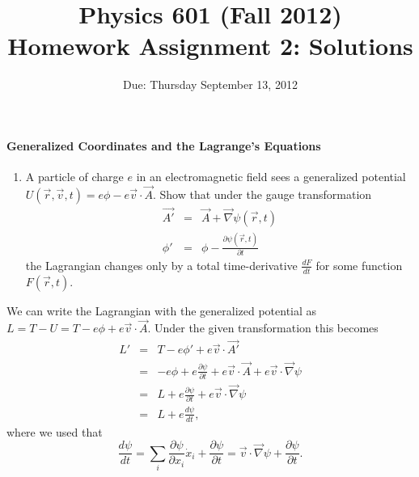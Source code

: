 \documentclass[letterpaper,11pt]{article}
\title{Physics 601 (Fall 2012) \\ Homework Assignment 2: Solutions}
\date{Due: Thursday September 13, 2012}
\begin{document}
\maketitle

\paragraph*{Generalized Coordinates and the Lagrange's Equations}
\begin{enumerate}
 \item A particle of charge $e$ in an electromagnetic field sees a generalized potential $U(\vec{r},\vec{v},t) = e \phi - e \vec{v} \cdot \vec{A}$.  Show that under the gauge transformation
  \begin{eqnarray*}
   \vec{A'} & = & \vec{A} + \vec{\nabla} \psi(\vec{r},t) \\
   \phi'    & = & \phi - \frac{\partial\psi(\vec{r},t)}{\partial t}
  \end{eqnarray*}
 the Lagrangian changes only by a total time-derivative $\frac{dF}{dt}$ for some function $F(\vec{r},t)$.
\end{enumerate}
We can write the Lagrangian with the generalized potential as $L = T - U = T - e \phi + e \vec{v} \cdot \vec{A}$.  Under the given transformation this becomes
\begin{eqnarray*}
 L' & = & T - e \phi' + e \vec{v} \cdot \vec{A'} \\
 & = &  - e \phi + e \frac{\partial\psi}{\partial t} + e \vec{v} \cdot \vec{A} + e \vec{v} \cdot \vec{\nabla} \psi \\
 & = & L + e \frac{\partial\psi}{\partial t} + e \vec{v} \cdot \vec{\nabla} \psi \\
 & = & L + e \frac{d\psi}{dt},
\end{eqnarray*}
where we used that
\begin{equation*}
 \frac{d\psi}{dt} = \sum_i \frac{\partial\psi}{\partial x_i} \dot{x}_i + \frac{\partial\psi}{\partial t} = \vec{v} \cdot \vec{\nabla} \psi + \frac{\partial\psi}{\partial t}.
\end{equation*}
\end{document}

